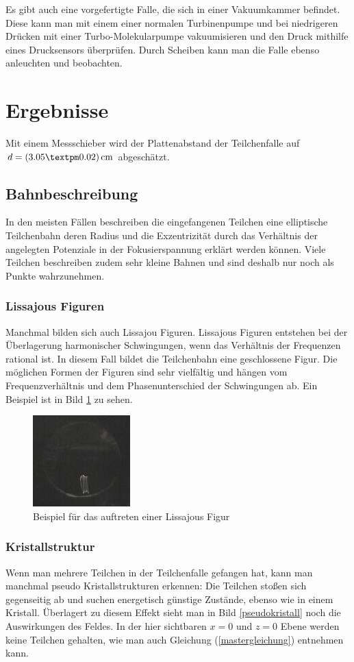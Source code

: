 \documentclass[a4paper,12pt]{article}
\begin{document}
Es gibt auch eine vorgefertigte Falle, die sich in einer Vakuumkammer befindet.
Diese kann man mit einem einer normalen Turbinenpumpe und bei niedrigeren Drücken mit einer Turbo-Molekularpumpe vakuumisieren und den Druck mithilfe eines Drucksensors überprüfen.
Durch Scheiben kann man die Falle ebenso anleuchten und beobachten.



\section{Ergebnisse}
Mit einem Messschieber wird der Plattenabstand der Teilchenfalle auf $d = \unit[(3.05±0.02)]{cm}$ abgeschätzt.
\subsection{Bahnbeschreibung}
In den meisten Fällen beschreiben die eingefangenen Teilchen eine elliptische Teilchenbahn deren Radius und die Exzentrizität durch das Verhältnis der angelegten Potenziale in der Fokusierspannung erklärt werden können.
Viele Teilchen beschreiben zudem sehr kleine Bahnen und sind deshalb nur noch als Punkte wahrzunehmen.

\subsubsection*{Lissajous Figuren}
Manchmal bilden sich auch Lissajou Figuren. Lissajous Figuren entstehen bei der Überlagerung harmonischer Schwingungen, wenn das Verhältnis der Frequenzen rational ist.
In diesem Fall bildet die Teilchenbahn eine geschlossene Figur.
Die möglichen Formen der Figuren sind sehr vielfältig und hängen vom Frequenzverhältnis und dem Phasenunterschied der Schwingungen ab.
Ein Beispiel ist in Bild \ref{Lissjous} zu sehen.

\begin{figure}[htb]
		\centering
		\includegraphics{lisa_klein.jpg}
		\caption{Beispiel für das auftreten einer Lissajous Figur}
		\label{Lissjous}
\end{figure}

\subsubsection*{Kristallstruktur}
Wenn man mehrere Teilchen in der Teilchenfalle gefangen hat, kann man manchmal pseudo Kristallstrukturen erkennen:
Die Teilchen stoßen sich gegenseitig ab und suchen energetisch günstige Zustände, ebenso wie in einem Kristall.
Überlagert zu diesem Effekt sieht man in Bild \ref{pseudokristall} noch die Auswirkungen des Feldes.
In der hier sichtbaren $x = 0$ und $z = 0$ Ebene werden keine Teilchen gehalten, wie man auch Gleichung (\ref{mastergleichung}) entnehmen kann.
\end{document}
